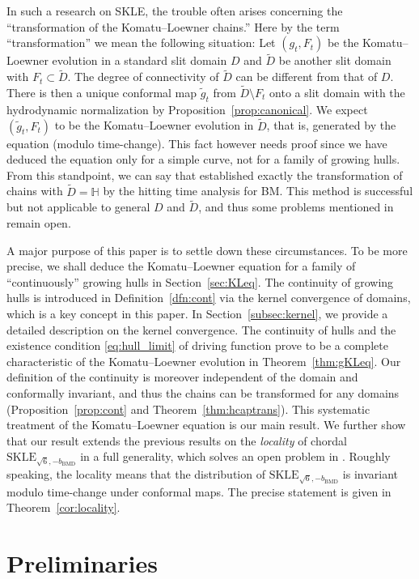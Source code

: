 \documentclass[preprint,12pt]{elsarticle}
\theoremstyle{definition}
\newcommand{\skle}{\mathrm{SKLE}}
\newcommand{\bmd}{\mathrm{BMD}}
\newcommand{\uhp}{\mathbb{H}}
\begin{document}
In such a research on SKLE, the trouble often arises
concerning the ``transformation of the Komatu--Loewner chains.''
Here by the term ``transformation'' we mean the following situation:
Let $(g_t, F_t)$ be the Komatu--Loewner evolution in a standard slit domain $D$
and $\tilde{D}$ be another slit domain with $F_t \subset \tilde{D}$.
The degree of connectivity of $\tilde{D}$ can be different from that of $D$.
There is then a unique conformal map $\tilde{g}_t$ from $\tilde{D} \setminus F_t$
onto a slit domain with the hydrodynamic normalization
by Proposition~\ref{prop:canonical}.
We expect $(\tilde{g}_t, F_t)$ to be the Komatu--Loewner evolution in $\tilde{D}$,
that is, generated by the equation (modulo time-change).
This fact however needs proof since we have deduced the equation
only for a simple curve, not for a family of growing hulls.
From this standpoint, we can say that \cite{CFS17} established
exactly the transformation of chains with $\tilde{D}=\uhp$
by the hitting time analysis for BM.
This method is successful but not applicable to general $D$ and $\tilde{D}$,
and thus some problems mentioned in \cite[Section~5]{CFS17} remain open.

A major purpose of this paper is to settle down these circumstances.
To be more precise, we shall deduce the Komatu--Loewner equation
for a family of ``continuously'' growing hulls in Section~\ref{sec:KLeq}.
The continuity of growing hulls is introduced in Definition~\ref{dfn:cont}
via the kernel convergence of domains, which is a key concept in this paper.
In Section~\ref{subsec:kernel},
we provide a detailed description on the kernel convergence.
The continuity of hulls and the existence condition \eqref{eq:hull_limit}
of driving function prove to be a complete characteristic
of the Komatu--Loewner evolution in Theorem~\ref{thm:gKLeq}.
Our definition of the continuity is moreover independent of the domain
and conformally invariant, and thus
the chains can be transformed for any domains
(Proposition~\ref{prop:cont} and Theorem~\ref{thm:hcaptrans}).
This systematic treatment of the Komatu--Loewner equation
is our main result.
We further show that our result extends the previous results on
the \emph{locality} of chordal $\skle_{\sqrt{6}, -b_{\bmd}}$ in a full generality,
which solves an open problem in \cite[Section~5]{CFS17}.
Roughly speaking, the locality means that the distribution of
$\skle_{\sqrt{6}, -b_{\bmd}}$ is invariant modulo time-change under conformal maps.
The precise statement is given in Theorem~\ref{cor:locality}.

\section{Preliminaries}
\label{sec:prel}
\end{document}
